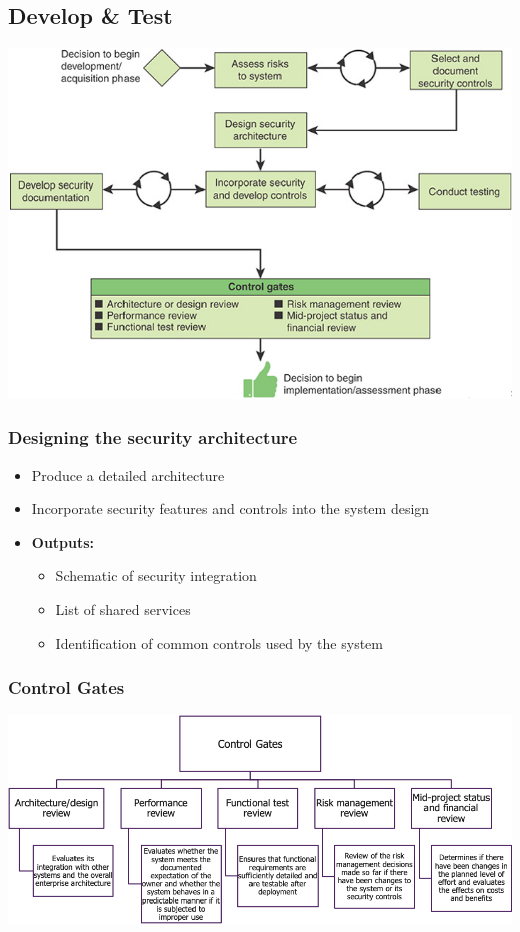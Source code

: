 \subsection{Develop \& Test}
\includegraphics[width=\linewidth]{../img/develop_and_test.png}

\subsubsection{Designing the security architecture}
\begin{itemize}
    \item Produce a detailed architecture
    \item Incorporate security features and controls into the system design
    \item \textbf{Outputs:} 
    \begin{itemize}
        \item Schematic of security integration
        \item List of shared services
        \item Identification of common controls used by the system
    \end{itemize}
\end{itemize}

\subsubsection{Control Gates}
\includegraphics[width=\linewidth]{../img/control_gates.png}

